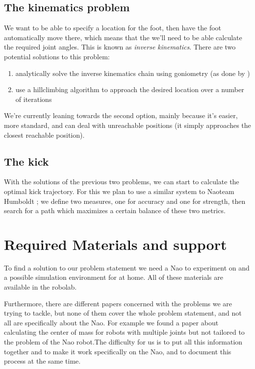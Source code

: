 \documentclass[a4paper]{article}
\begin{document}
\subsection{The kinematics problem}
We want to be able to specify a location for the foot, then have the foot automatically move there, which means that the we’ll need to be able calculate the required joint angles. This is known as \emph{inverse kinematics}. There are two potential solutions to this problem:
\begin{enumerate}
  \item analytically solve the inverse kinematics chain using goniometry (as done by \cite{Graf2009})
\item use a hillclimbing algorithm to approach the desired location over a number of iterations
\end{enumerate}

We’re currently leaning towards the second option, mainly because it’s easier, more standard, and can deal with unreachable positions (it simply approaches the closest reachable position).

\subsection{The kick}
With the solutions of the previous two problems, we can start to calculate the optimal kick trajectory. For this we plan to use a similar system to Naoteam Humboldt \cite{Muller2011}; we define two measures, one for accuracy and one for strength, then search for a path which maximizes a certain balance of these two metrics. 



\section{Required Materials and support} 
To find a solution to our problem statement we need a Nao to experiment on and a possible simulation environment for at home. All of these materials are available in the robolab.

Furthermore, there are different papers concerned with the problems we are trying to tackle, but none of them cover the whole problem statement, and not all are specifically about the Nao. For example we found a paper about calculating the center of mass for robots with multiple joints but not tailored to the problem of the Nao robot.The difficulty for us is to put all this information together and to make it work specifically on the Nao, and to document this process at the same time.
\end{document}
